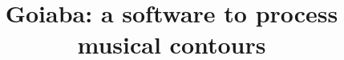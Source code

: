 \documentclass[12pt]{article}
\title{Goiaba: a software to process musical contours}
\author{}
\begin{document}
 

\maketitle

\begin{abstract}
  
\end{abstract}
     
\begin{resumo}
  
\end{resumo}





\end{document}

